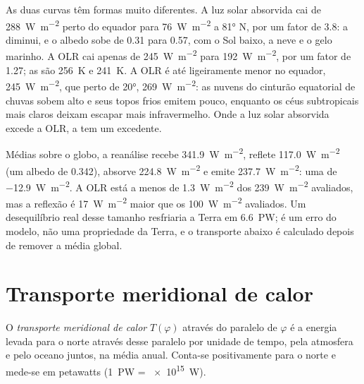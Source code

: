 As duas curvas têm formas muito diferentes. A luz solar absorvida cai de \qty{288}{W.m^{-2}} perto
do equador para \qty{76}{W.m^{-2}} a \ang{81} N, por um fator de \num{3.8}: a  diminui, e
o albedo sobe de \num{0.31} para \num{0.57}, com o Sol baixo, a neve e o gelo marinho. A OLR cai
apenas de \qty{245}{W.m^{-2}} para \qty{192}{W.m^{-2}}, por um fator de \num{1.27}; as  são \qty{256}{K} e \qty{241}{K}. A OLR é até ligeiramente menor no equador,
\qty{245}{W.m^{-2}}, que perto de \ang{20}, \qty{269}{W.m^{-2}}: as nuvens do cinturão equatorial
de chuvas sobem alto e seus topos frios emitem pouco, enquanto os céus subtropicais mais claros
deixam escapar mais infravermelho. Onde a luz solar absorvida excede a OLR, a  tem um
excedente.

\begin{example}\label{ex:b1:radiation-heat-transport:global}
Médias sobre o globo, a reanálise recebe \qty{341.9}{W.m^{-2}}, reflete \qty{117.0}{W.m^{-2}} (um
albedo de \num{0.342}), absorve \qty{224.8}{W.m^{-2}} e emite \qty{237.7}{W.m^{-2}}: uma  de \qty{-12.9}{W.m^{-2}}. A OLR está a menos de \qty{1.3}{W.m^{-2}} dos \qty{239}{W.m^{-2}}
avaliados, mas a reflexão é \qty{17}{W.m^{-2}} maior que os \qty{100}{W.m^{-2}} avaliados. Um
desequilíbrio real desse tamanho resfriaria a Terra em \qty{6.6}{PW}; é um erro do modelo, não uma
propriedade da Terra, e o transporte abaixo é calculado depois de remover a média global.
\end{example}

\section{Transporte meridional de calor}\label{sec:b1:radiation-heat-transport:transport}

\begin{definition}\label{def:b1:radiation-heat-transport:mht}
O \emph{transporte meridional de calor} $T(\varphi)$ através
do paralelo de  $\varphi$ é a energia levada para o norte através desse paralelo por unidade
de tempo, pela atmosfera e pelo oceano juntos, na média anual. Conta-se positivamente para o norte e
mede-se em petawatts (\qty{1}{PW} = \qty{e15}{W}).
\end{definition}

